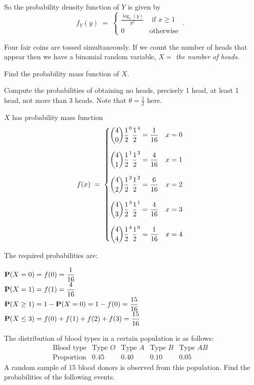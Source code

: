 \begin{ExerciseList}
So the  probability density
  function  of $Y$ is given by
\[f_Y(y)\;=\;\begin{cases} \displaystyle  \frac{\log_e(y)}{y^2} &   \text{ if } x \geqslant 1 \\ 0 &
  \text{otherwise}
\end{cases} \,.
\]

\Exercise
Four fair coins are tossed simultaneously.  
If we count the number of heads that appear then we have a  binomial random variable,  $X=$ {\it the number of heads}.
\be
\item Find the probability mass
  function of  $X$.
\item  Compute the probabilities of obtaining no heads, precisely 1
  head, at least 1 head, not more than 3 heads.
\ee
\Answer
Note that  $\theta=\frac{1}{2}$ here.
\be
\item $X$ has probability mass function
\[f(x)\;=\;\begin{cases}
\displaystyle\displaystyle \binom{4}{0}\frac{1}{2}^0\frac{1}{2}^4=\frac{1}{16}&x=0\\[16pt]
\displaystyle\displaystyle\binom{4}{1}\frac{1}{2}^1\frac{1}{2}^3=\frac{4}{16}&x=1\\[16pt]
\displaystyle\displaystyle\binom{4}{2}\frac{1}{2}^2\frac{1}{2}^2=\frac{6}{16}&x=2\\[16pt]
\displaystyle\binom{4}{3}\frac{1}{2}^3\frac{1}{2}^1=\frac{4}{16}&x=3\\[16pt]
\displaystyle\binom{4}{4}\frac{1}{2}^4\frac{1}{2}^0=\frac{1}{16}&x=4
\displaystyle\end{cases}
\]

\item The required probabilities are:

$\displaystyle \mathbf{P}(X=0)=f(0)=\frac{1}{16}$\\[3pt]
$\displaystyle \mathbf{P}(X=1)=f(1)=\frac{4}{16}$\\[3pt]
$\displaystyle \mathbf{P}(X\geq1)=1-\mathbf{P}(X=0)=1-f(0)=\frac{15}{16}$\\[3pt]
$\displaystyle \mathbf{P}(X\leq3)=f(0)+f(1)+f(2)+f(3)=\frac{15}{16}$
\ee

\Exercise
The distribution of blood types in a certain  population is as follows:
$$
\begin{array}{c|cccc}
\text{Blood type}&\text{Type } O&\text{Type } A&\text{Type } B& \text{Type }AB\\\hline
\text{Proportion}&0.45&0.40&0.10&0.05
\end{array}
$$
A random sample of 15 blood donors is observed from this
population. Find the probabilities of the following events.


\end{ExerciseList}
